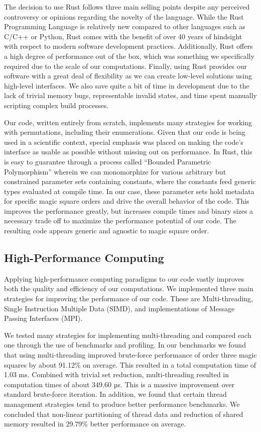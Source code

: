 \documentclass{rhumj_new}
\begin{document}
The decision to use Rust follows three main selling points despite any perceived controversy or
opinions regarding the novelty of the language. While the Rust Programming Language is relatively
new compared to other languages such as C/C++ or Python, Rust comes with the benefit of over 40
years of hindsight with respect to modern software development practices. Additionally, Rust offers
a high degree of performance out of the box, which was something we specifically required due to
the scale of our computations. Finally, using Rust provides our software with a great deal of
flexibility as we can create low-level solutions using high-level interfaces. We also save quite a
bit of time in development due to the lack of trivial memory bugs, representable invalid states,
and time spent manually scripting complex build processes.

Our code, written entirely from scratch, implements many strategies for working with permutations,
including their enumerations. Given that our code is being used in a scientific context, special
emphasis was placed on making the code's interface as usable as possible without missing out on
performance. In Rust, this is easy to guarantee through a process called ``Bounded Parametric
Polymorphism'' wherein we can monomorphize for various arbitrary but constrained parameter sets
containing constants, where the constants feed generic types evaluated at compile
time\cite{Cardelli}. In our case, these parameter sets hold metadata for specific magic square
orders and drive the overall behavior of the code. This improves the performance greatly, but
increases compile times and binary sizes \textemdash{} a necessary trade off to maximize the
performance potential of our code. The resulting code appears generic and agnostic to magic square
order.

\subsection{High-Performance Computing}

Applying high-performance computing paradigms to our code vastly improves both the quality and
efficiency of our computations. We implemented three main strategies for improving the performance
of our code. These are Multi-threading, Single Instruction Multiple Data (SIMD), and
implementations of Message Passing Interfaces (MPI).

We tested many strategies for implementing multi-threading and compared each one through the use of
benchmarks and profiling. In our benchmarks we found that using multi-threading improved
brute-force performance of order three magic squares by about 91.12\% on average. This resulted in
a total computation time of 1.03 ms. Combined with trivial set reduction, multi-threading resulted
in computation times of about 349.60 µs. This is a massive improvement over standard brute-force
iteration. In addition, we found that certain thread management strategies tend to produce better
performance benchmarks. We concluded that non-linear partitioning of thread data and reduction of
shared memory resulted in 29.79\% better performance on average.
\end{document}
